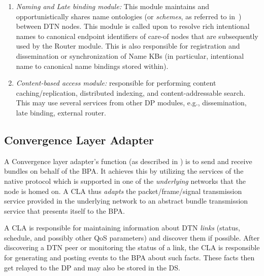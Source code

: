 \documentclass[11pt]{article}
\begin{document}
\begin{enumerate}
\item {\it Naming and Late binding module:} This module maintains and
opportunistically shares name ontologies (or {\it schemes}, as referred to
in~\cite{BP-ID}) between DTN nodes. This module is called upon to resolve rich
intentional names to canonical endpoint identifiers of care-of nodes that are
subsequently used by the Router module. This is also responsible for
registration and dissemination or synchronization of Name KBs (in particular,
intentional name to canonical name bindings stored within).

\item {\it Content-based access module:} responsible for performing content
caching/replication, distributed indexing, and content-addressable search.
This may use several services from other DP modules, e.g., dissemination, late
binding, external router.


\end{enumerate}

\subsection{Convergence Layer Adapter}
\label{sec:cla}

A Convergence layer adapter's function (as described in \cite{BP-ID}) is to
send and receive bundles on behalf of the BPA. It achieves this by utilizing
the services of the native protocol which is supported in one of the {\it
underlying} networks that the node is homed on. A CLA thus {\it adapts} the
packet/frame/signal transmission service provided in the underlying network to
an abstract bundle transmission service that presents itself to the BPA.  

A CLA is responsible for maintaining information about DTN {\it links} (status,
schedule, and possibly other QoS parameters) and discover them if possible.
After discovering a DTN peer or monitoring the status of a link, the CLA is
responsible for generating and posting events to the BPA about such facts.
These facts then get relayed to the DP and may also be stored in the DS. 

\end{document}
